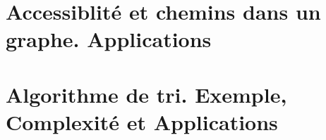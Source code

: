 \chapter{Accessiblité et chemins dans un graphe. Applications}
\label{L7}


\chapter{Algorithme de tri. Exemple, Complexité et Applications}
\label{L8}


%
 


